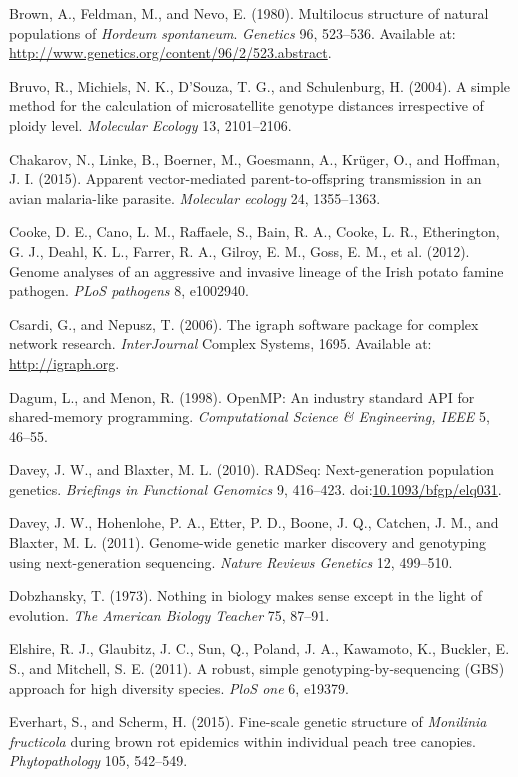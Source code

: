 \documentclass{frontiersSCNS} %
\begin{document}
Brown, A., Feldman, M., and Nevo, E. (1980). Multilocus structure of
natural populations of \emph{Hordeum spontaneum}. \emph{Genetics} 96,
523--536. Available at:
\url{http://www.genetics.org/content/96/2/523.abstract}.

Bruvo, R., Michiels, N. K., D'Souza, T. G., and Schulenburg, H. (2004).
A simple method for the calculation of microsatellite genotype distances
irrespective of ploidy level. \emph{Molecular Ecology} 13, 2101--2106.

Chakarov, N., Linke, B., Boerner, M., Goesmann, A., Kr{ü}ger, O., and
Hoffman, J. I. (2015). Apparent vector-mediated parent-to-offspring
transmission in an avian malaria-like parasite. \emph{Molecular ecology}
24, 1355--1363.

Cooke, D. E., Cano, L. M., Raffaele, S., Bain, R. A., Cooke, L. R.,
Etherington, G. J., Deahl, K. L., Farrer, R. A., Gilroy, E. M., Goss, E.
M., et al. (2012). Genome analyses of an aggressive and invasive lineage
of the Irish potato famine pathogen. \emph{PLoS pathogens} 8, e1002940.

Csardi, G., and Nepusz, T. (2006). The igraph software package for
complex network research. \emph{InterJournal} Complex Systems, 1695.
Available at: \url{http://igraph.org}.

Dagum, L., and Menon, R. (1998). OpenMP: An industry standard API for
shared-memory programming. \emph{Computational Science \& Engineering,
IEEE} 5, 46--55.

Davey, J. W., and Blaxter, M. L. (2010). RADSeq: Next-generation
population genetics. \emph{Briefings in Functional Genomics} 9,
416--423.
doi:\href{http://dx.doi.org/10.1093/bfgp/elq031}{10.1093/bfgp/elq031}.

Davey, J. W., Hohenlohe, P. A., Etter, P. D., Boone, J. Q., Catchen, J.
M., and Blaxter, M. L. (2011). Genome-wide genetic marker discovery and
genotyping using next-generation sequencing. \emph{Nature Reviews
Genetics} 12, 499--510.

Dobzhansky, T. (1973). Nothing in biology makes sense except in the
light of evolution. \emph{The American Biology Teacher} 75, 87--91.

Elshire, R. J., Glaubitz, J. C., Sun, Q., Poland, J. A., Kawamoto, K.,
Buckler, E. S., and Mitchell, S. E. (2011). A robust, simple
genotyping-by-sequencing (GBS) approach for high diversity species.
\emph{PloS one} 6, e19379.

Everhart, S., and Scherm, H. (2015). Fine-scale genetic structure of
\emph{Monilinia fructicola} during brown rot epidemics within individual
peach tree canopies. \emph{Phytopathology} 105, 542--549.
\end{document}
